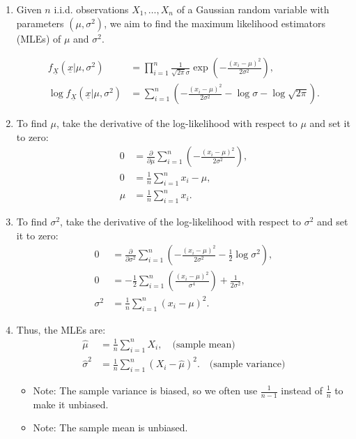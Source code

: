 \begin{example}
    \begin{enumerate}
        \item Given $n$ i.i.d. observations $X_1, \dots, X_n$ of a Gaussian random variable with parameters $(\mu, \sigma^2)$, we aim to find the maximum likelihood estimators (MLEs) of $\mu$ and $\sigma^2$.

        \begin{align*}
        f_{\underline{X}}(\underline{x} | \mu, \sigma^2) &= \prod_{i=1}^n \frac{1}{\sqrt{2\pi} \sigma} \exp\left(-\frac{(x_i - \mu)^2}{2\sigma^2}\right), \\
        \log f_{\underline{X}}(\underline{x} | \mu, \sigma^2) &= \sum_{i=1}^n \left(-\frac{(x_i - \mu)^2}{2\sigma^2} - \log \sigma - \log \sqrt{2\pi}\right).
        \end{align*}
    
        \item To find $\mu$, take the derivative of the log-likelihood with respect to $\mu$ and set it to zero:
        \begin{align*}
        0 &= \frac{\partial}{\partial \mu} \sum_{i=1}^n \left(-\frac{(x_i - \mu)^2}{2\sigma^2}\right), \\
        0 &= \frac{1}{n} \sum_{i=1}^n x_i - \mu, \\
        \mu &= \frac{1}{n} \sum_{i=1}^n x_i.
        \end{align*}
    
        \item To find $\sigma^2$, take the derivative of the log-likelihood with respect to $\sigma^2$ and set it to zero:
        \begin{align*}
        0 &= \frac{\partial}{\partial \sigma^2} \sum_{i=1}^n \left(-\frac{(x_i - \mu)^2}{2\sigma^2} - \frac{1}{2} \log \sigma^2\right), \\
        0 &= -\frac{1}{2} \sum_{i=1}^n \left(\frac{(x_i - \mu)^2}{\sigma^4}\right) + \frac{1}{2\sigma^2}, \\
        \sigma^2 &= \frac{1}{n} \sum_{i=1}^n (x_i - \mu)^2.
        \end{align*}
    
        \item Thus, the MLEs are:
        \begin{align*}
        \hat{\mu} &= \frac{1}{n} \sum_{i=1}^n X_i, \quad \text{(sample mean)} \\
        \hat{\sigma}^2 &= \frac{1}{n} \sum_{i=1}^n (X_i - \hat{\mu})^2. \quad \text{(sample variance)}
        \end{align*}
        \begin{itemize}
            \item Note: The sample variance is biased, so we often use $\frac{1}{n-1}$ instead of $\frac{1}{n}$ to make it unbiased.
            \item Note: The sample mean is unbiased.
        \end{itemize}
    \end{enumerate}
\end{example}

